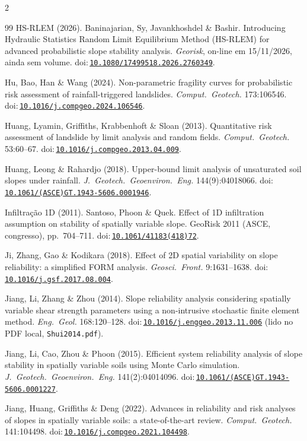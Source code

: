 \documentclass[11pt,a4paper]{article}
\newcommand{\doi}[1]{doi:\,\href{https://doi.org/#1}{\nolinkurl{#1}}}
\begin{document}
\begin{multicols}{2}
\begin{thebibliography}{99}
 HS-RLEM (2026). Baninajarian, Sy, Javankhoshdel \& Bashir. Introducing Hydraulic
Statistics Random Limit Equilibrium Method (HS-RLEM) for advanced probabilistic slope stability analysis.
\emph{Georisk}, on-line em 15/11/2026, ainda sem volume. \doi{10.1080/17499518.2026.2760349}.

 Hu, Bao, Han \& Wang (2024). Non-parametric fragility curves for probabilistic risk
assessment of rainfall-triggered landslides. \emph{Comput.\ Geotech.} 173:106546. \doi{10.1016/j.compgeo.2024.106546}.

 Huang, Lyamin, Griffiths, Krabbenhoft \& Sloan (2013). Quantitative risk
assessment of landslide by limit analysis and random fields. \emph{Comput.\ Geotech.} 53:60--67.
\doi{10.1016/j.compgeo.2013.04.009}.

 Huang, Leong \& Rahardjo (2018). Upper-bound limit analysis of unsaturated soil
slopes under rainfall. \emph{J.\ Geotech.\ Geoenviron.\ Eng.} 144(9):04018066.
\doi{10.1061/(ASCE)GT.1943-5606.0001946}.

 Infiltração 1D (2011). Santoso, Phoon \& Quek. Effect of 1D
infiltration assumption on stability of spatially variable slope. GeoRisk 2011 (ASCE, congresso), pp.\ 704--711.
\doi{10.1061/41183(418)72}.

 Ji, Zhang, Gao \& Kodikara (2018). Effect of 2D spatial variability on slope
reliability: a simplified FORM analysis. \emph{Geosci.\ Front.} 9:1631--1638. \doi{10.1016/j.gsf.2017.08.004}.

 Jiang, Li, Zhang \& Zhou (2014). Slope reliability analysis considering
spatially variable shear strength parameters using a non-intrusive stochastic finite element method. \emph{Eng.\ Geol.}
168:120--128. \doi{10.1016/j.enggeo.2013.11.006} (lido no PDF local, \texttt{Shui2014.pdf}).

 Jiang, Li, Cao, Zhou \& Phoon (2015). Efficient system reliability analysis of
slope stability in spatially variable soils using Monte Carlo simulation. \emph{J.\ Geotech.\ Geoenviron.\ Eng.}
141(2):04014096. \doi{10.1061/(ASCE)GT.1943-5606.0001227}.

 Jiang, Huang, Griffiths \& Deng (2022). Advances in reliability and risk analyses
of slopes in spatially variable soils: a state-of-the-art review. \emph{Comput.\ Geotech.} 141:104498.
\doi{10.1016/j.compgeo.2021.104498}.


\end{thebibliography}
\end{multicols}
\end{document}
